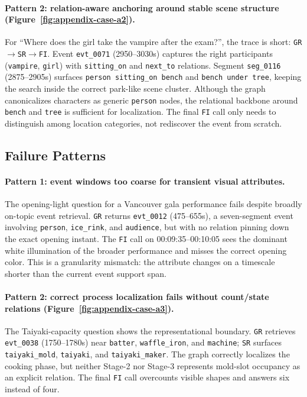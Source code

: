 \documentclass[sigconf, screen, review, anonymous]{acmart}
\begin{document}
\paragraph{Pattern 2: relation-aware anchoring around stable scene structure (Figure~\ref{fig:appendix-case-a2}).}
For ``Where does the girl take the vampire after the exam?'', the trace is
short: \texttt{GR}$\to$\texttt{SR}$\to$\texttt{FI}. Event \texttt{evt\_0071}
(2950--3030s) captures the right participants (\texttt{vampire},
\texttt{girl}) with \texttt{sitting\_on} and \texttt{next\_to} relations. Segment
\texttt{seg\_0116} (2875--2905s) surfaces \texttt{person sitting\_on bench} and
\texttt{bench under tree}, keeping the search inside the correct park-like scene
cluster. Although the graph canonicalizes characters as generic \texttt{person}
nodes, the relational backbone around \texttt{bench} and \texttt{tree} is
sufficient for localization. The final \texttt{FI} call only needs to
distinguish among location categories, not rediscover the event from scratch.

\subsection{Failure Patterns}

\paragraph{Pattern 1: event windows too coarse for transient visual attributes.}
The opening-light question for a Vancouver gala performance fails despite
broadly on-topic event retrieval. \texttt{GR} returns \texttt{evt\_0012}
(475--655s), a seven-segment event involving \texttt{person}, \texttt{ice\_rink},
and \texttt{audience}, but with no relation pinning down the exact opening
instant. The \texttt{FI} call on 00:09:35--00:10:05 sees the dominant white
illumination of the broader performance and misses the correct opening color.
This is a granularity mismatch: the attribute changes on a timescale shorter
than the current event support span.

\paragraph{Pattern 2: correct process localization fails without count/state relations (Figure~\ref{fig:appendix-case-a3}).}
The Taiyaki-capacity question shows the representational boundary.
\texttt{GR} retrieves \texttt{evt\_0038} (1750--1780s) near \texttt{batter},
\texttt{waffle\_iron}, and \texttt{machine}; \texttt{SR} surfaces \texttt{taiyaki\_mold},
\texttt{taiyaki}, and \texttt{taiyaki\_maker}. The graph correctly localizes the
cooking phase, but neither Stage-2 nor Stage-3 represents mold-slot occupancy
as an explicit relation. The final \texttt{FI} call overcounts visible shapes
and answers six instead of four.
\end{document}
